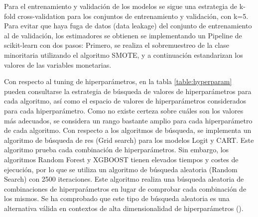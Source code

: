 Para el entrenamiento y validación de los modelos se sigue una estrategia de k-fold cross-validation para los conjuntos de entrenamiento y validación, con k=5. Para evitar que haya fuga de datos (data leakage) del conjunto de entrenamiento al de validación, los estimadores se obtienen se implementando un Pipeline de scikit-learn con dos pasos: Primero, se realiza el sobremuestreo de la clase minoritaria utilizando el algoritmo SMOTE, y a continuación estandarizan los valores de las variables monetarias.

Con respecto al tuning de hiperparámetros, en la tabla \ref{table:hyperparam} pueden consultarse la estrategia de búsqueda de valores de hiperparámetros para cada algoritmo, así como el espacio de valores de hiperparámetros considerados para cada hiperparámetro. Como no existe certeza sobre cuáles son los valores más adecuados, se considera un rango bastante amplio para cada hiperparámetro de cada algoritmo. Con respecto a los algoritmos de búsqueda, se implementa un algoritmo de búsqueda de res (Grid search) para los modelos Logit y CART. Este algoritmo prueba cada combinación de hiperparámetros. Sin embargo, los algoritmos Random Forest y XGBOOST tienen elevados tiempos y costes de ejecución, por lo que se utiliza un algoritmo de búsqueda aleatoria (Random Search) con 2500 iteraciones. Este algoritmo realiza una búsqueda aleatoria de combinaciones de hiperparámetros en lugar de comprobar cada combinación de los mismos. Se ha comprobado que este tipo de búsqueda aleatoria es una alternativa válida en contextos de alta dimensionalidad de hiperparámetros (\cite{bergstra2012random}).


